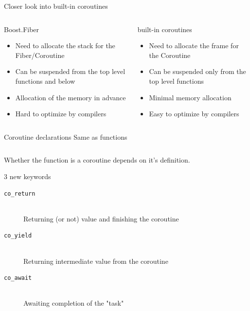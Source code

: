 \documentclass[10pt]{beamer}
\newcommand{\code}[1]{\texttt{#1}}
\begin{document}
\begin{frame}{Closer look into built-in coroutines}

  \begin{columns}[t]
  \begin{column}{0.48\linewidth}
  \centerline{Boost.Fiber}
  \vfill
  \begin{itemize}
  \item Need to allocate the stack for the Fiber/Coroutine
  \item Can be suspended from the top level functions and below
  \item Allocation of the memory in advance
  \item Hard to optimize by compilers
  \end{itemize}
  \end{column}
  \begin{column}{0.48\linewidth}
  \centerline{\alert{built-in coroutines}}
  \vfill
  \begin{itemize}[<+- |alert@+>]
  \item Need to allocate the frame for the Coroutine
  \item Can be suspended only from the top level functions
  \item Minimal memory allocation
  \item Easy to optimize by compilers
  \end{itemize}
  \end{column}
  
  \end{columns}
  
\end{frame}

\begin{frame}[fragile]{Coroutine declarations}
  \centering Same as functions

  \vfill
  \begin{center}
  \begin{minipage}{0.7\linewidth}
  \inputminted{c++}{code-examples/intro/declaration.hpp}
  \end{minipage}
  \end{center}
  \vfill

  Whether the function is a coroutine depends on \alert{it's definition}.

\end{frame}

\begin{frame}{3 new keywords}
  \begin{description}
    \item [\code{co\_return}] \hfill \\ Returning (or not) value and finishing the coroutine
    \item [\code{co\_yield}] \hfill \\ Returning intermediate value from the coroutine
    \item [\code{co\_await}] \hfill \\ Awaiting completion of the "task"
  \end{description}
\end{frame}
\end{document}
